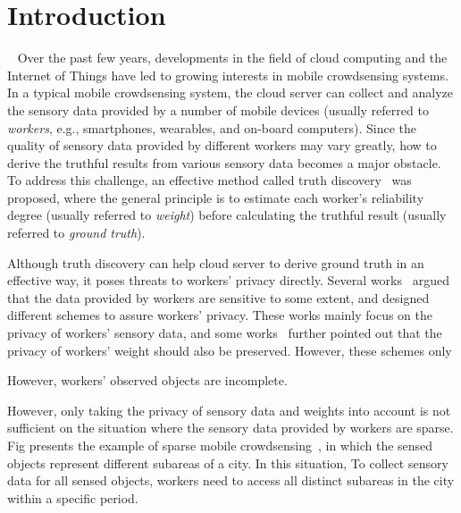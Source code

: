 \documentclass[conference]{IEEEtran}
\begin{document}
\section{Introduction}~\label{sec1}
Over the past few years, developments in the field of cloud computing and the Internet of Things have led to growing interests in mobile crowdsensing systems.
In a typical mobile crowdsensing system, the cloud server can collect and analyze the sensory data provided by a number of mobile devices (usually referred to {\em workers}, e.g., smartphones, wearables, and on-board computers).
Since the quality of sensory data provided by different workers may vary greatly, how to derive the truthful results from various sensory data becomes a major obstacle.
To address this challenge, an effective method called truth discovery~\cite{li_resolving_2014,li_confidence-aware_2014,li_conflicts_2016} was proposed, where the general principle is to estimate each worker's reliability degree (usually referred to {\em weight}) before calculating the truthful result (usually referred to {\em ground truth}).

Although truth discovery can help cloud server to derive ground truth in an effective way, it poses threats to workers' privacy directly.
Several works~\cite{miao_cloud-enabled_2015,miao_lightweight_2017,xu_efficient_2019,zhang_reliable_2019,xue_inpptd_2020} argued that the data provided by workers are sensitive to some extent, and designed different schemes to assure workers' privacy.
These works mainly focus on the privacy of workers' sensory data, and some works~\cite{zhang_reliable_2019,xue_inpptd_2020} further pointed out that the privacy of workers' weight should also be preserved.
However, these schemes only 



However, 
workers' observed objects are incomplete.

However, only taking the privacy of sensory data and weights into account is not sufficient on the situation where the sensory data provided by workers are sparse.
Fig presents the example of sparse mobile crowdsensing~\cite{wang_sparse_2016}, in which the sensed objects represent different subareas of a city.
In this situation, 
To collect sensory data for all sensed objects, workers need to access all distinct subareas in the city within a specific period.
\end{document}
